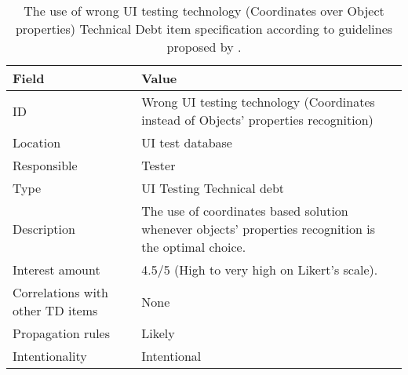         \begin{table}[!htbp]
		\centering
		\tabulinesep=1.2mm
		\begin{tabu} to \textwidth {|X|X[3]|}
			
			\hline
			\textbf{Field} & \textbf{Value} \\ 
			\hline
			
			ID & Wrong UI testing technology (Coordinates instead of Objects' properties recognition)\\
			\hline
			
			Location & UI test database \\
			\hline
			
			Responsible & Tester \\
			\hline
			
			Type & UI Testing Technical debt \\
			\hline	
			
			Description & The use of coordinates based solution whenever objects' properties recognition is the optimal choice.\\
			\hline
			
			
			
			Interest amount &  4.5/5 (High to very high on Likert's scale). \\
			\hline
			
			
			
			Correlations with other TD items & None\\
			\hline 	 
			
			
			
			Propagation rules & Likely\\
			\hline
			
			Intentionality & Intentional \\
			\hline 	 	
			
		\end{tabu}
		\caption[Use of wrong UI testing technology - Coordinates over Objects' properties - TD item specification]{The use of wrong UI testing technology (Coordinates over Object properties) Technical Debt item specification according to guidelines proposed by \cite{mapping_study_td}.}
		\label{tab:res-coordinates-vs-property}
	\end{table}
	
